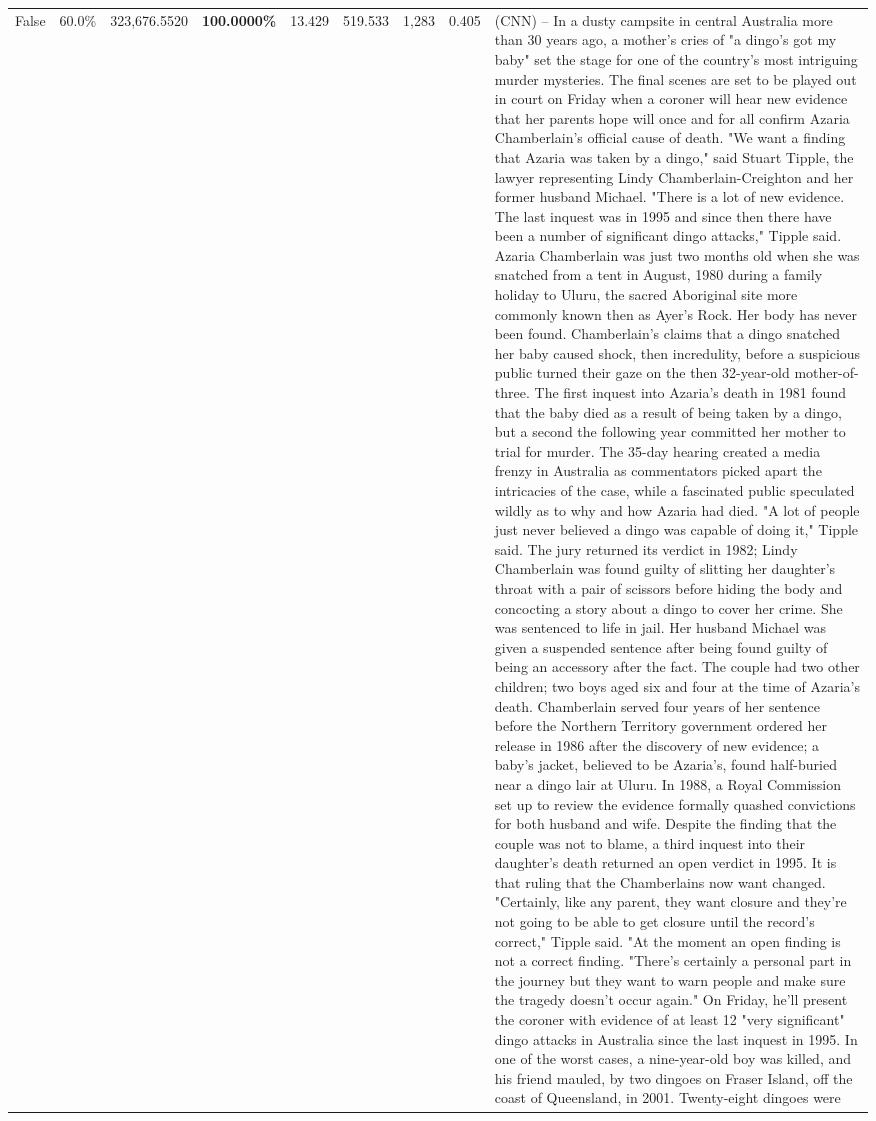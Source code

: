 \begin{table}[H]
\begin{tabular}{lllrlllll}
False & 60.0\% & 323,676.5520 & \bfseries \color{red} 100.0000\% & 13.429 & 519.533 & 1,283 & 0.405 & (CNN) -- In a dusty campsite in central Australia more than 30 years ago, a mother's cries of "a dingo's got my baby" set the stage for one of the country's most intriguing murder mysteries. The final scenes are set to be played out in court on Friday when a coroner will hear new evidence that her parents hope will once and for all confirm Azaria Chamberlain's official cause of death. "We want a finding that Azaria was taken by a dingo," said Stuart Tipple, the lawyer representing Lindy Chamberlain-Creighton and her former husband Michael. "There is a lot of new evidence. The last inquest was in 1995 and since then there have been a number of significant dingo attacks," Tipple said. Azaria Chamberlain was just two months old when she was snatched from a tent in August, 1980 during a family holiday to Uluru, the sacred Aboriginal site more commonly known then as Ayer's Rock. Her body has never been found. Chamberlain's claims that a dingo snatched her baby caused shock, then incredulity, before a suspicious public turned their gaze on the then 32-year-old mother-of-three. The first inquest into Azaria's death in 1981 found that the baby died as a result of being taken by a dingo, but a second the following year committed her mother to trial for murder. The 35-day hearing created a media frenzy in Australia as commentators picked apart the intricacies of the case, while a fascinated public speculated wildly as to why and how Azaria had died. "A lot of people just never believed a dingo was capable of doing it," Tipple said. The jury returned its verdict in 1982; Lindy Chamberlain was found guilty of slitting her daughter's throat with a pair of scissors before hiding the body and concocting a story about a dingo to cover her crime. She was sentenced to life in jail. Her husband Michael was given a suspended sentence after being found guilty of being an accessory after the fact. The couple had two other children; two boys aged six and four at the time of Azaria's death. Chamberlain served four years of her sentence before the Northern Territory government ordered her release in 1986 after the discovery of new evidence; a baby's jacket, believed to be Azaria's, found half-buried near a dingo lair at Uluru. In 1988, a Royal Commission set up to review the evidence formally quashed convictions for both husband and wife. Despite the finding that the couple was not to blame, a third inquest into their daughter's death returned an open verdict in 1995. It is that ruling that the Chamberlains now want changed. "Certainly, like any parent, they want closure and they're not going to be able to get closure until the record's correct," Tipple said. "At the moment an open finding is not a correct finding. "There's certainly a personal part in the journey but they want to warn people and make sure the tragedy doesn't occur again." On Friday, he'll present the coroner with evidence of at least 12 "very significant" dingo attacks in Australia since the last inquest in 1995. In one of the worst cases, a nine-year-old boy was killed, and his friend mauled, by two dingoes on Fraser Island, off the coast of Queensland, in 2001. Twenty-eight dingoes were 
\end{tabular}
\end{table}
